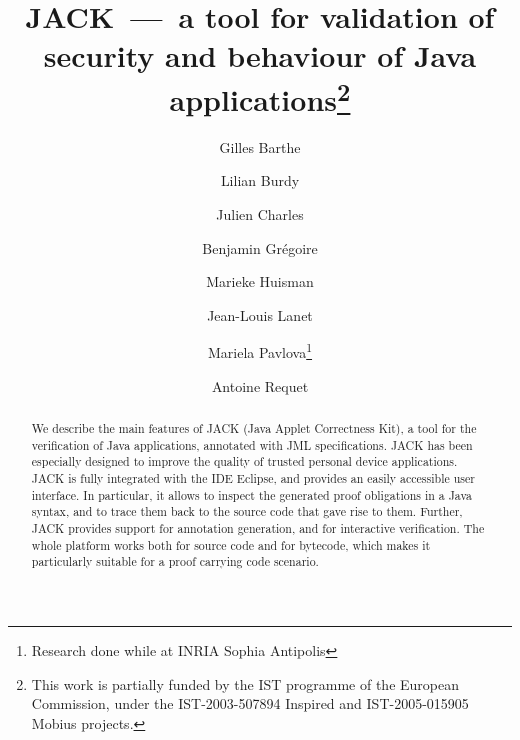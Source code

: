 \documentclass{llncs}
\title{JACK~---~a tool for validation of security and behaviour of Java
applications\thanks{This work is partially funded by the IST programme
of the European Commission, under the IST-2003-507894
\textsf{Inspired} and IST-2005-015905 \textsf{Mobius} projects.}}
\author{Gilles Barthe\inst{1} \and
        Lilian Burdy\and %
        Julien Charles\inst{1} \and
        Benjamin Gr\'egoire\inst{1} \and
        Marieke Huisman\inst{1} \and
        Jean-Louis Lanet\inst{2} \and
        Mariela Pavlova\inst{3}\thanks{Research done while at INRIA Sophia Antipolis} \and
        Antoine Requet\inst{2}}
\institute{INRIA Sophia Antipolis, France \and 
           gemalto, France \and 
           Ludwig-Maximilians-Universit\"at M\"unchen, Germany}
\begin{document}
\maketitle      
\begin{abstract}
We describe the main features of JACK (Java Applet Correctness Kit), a
tool for the verification of Java applications, annotated with JML
specifications. JACK has been especially designed to improve the
quality of trusted personal device applications. JACK is fully
integrated with the IDE Eclipse, and provides an easily accessible
user interface. In particular, it allows to inspect the generated
proof obligations in a Java syntax, and to trace them back to the
source code that gave rise to them. Further, JACK provides support for
annotation generation, and for interactive verification. The whole
platform works both for source code and for bytecode, which makes it
particularly suitable for a proof carrying code scenario.
\end{abstract}
        










\end{document}
